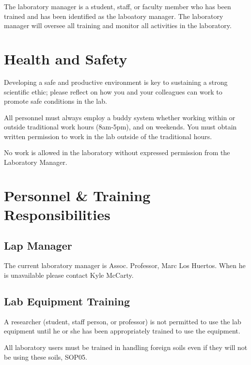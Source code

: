\documentclass[12pt]{../../cls/SOP4_alpha}\usepackage[]{graphicx}\usepackage[]{xcolor}
\begin{document}
\NP The laboratory manager is a student, staff, or faculty member who has been trained and has been identified as the laboatory manager. The laboratory manager will oversee all training and monitor all activities in the laboratory. 


\section{Health and Safety}

\NP Developing a safe and productive environment is key to sustaining a strong scientific ethic; please reflect on how you and your colleagues can work to promote safe conditions in the lab.

\NP All personnel must always employ a buddy system whether working within or outside traditional work hours (8am-5pm), and on weekends. You must obtain written permission to work in the lab outside of the traditional hours.

\NP No work is allowed in the laboratory without expressed permission from the Laboratory Manager.

\section{Personnel \& Training Responsibilities}

\subsection*{Lap Manager}

The current laboratory manager is Assoc. Professor, Marc Los Huertos. When he is unavailable please contact Kyle McCarty. 

\subsection*{Lab Equipment Training}

\NP A researcher (student, staff person, or professor) is not permitted to use the lab equipment until he or she has been appropriately trained to use the equipment.

\NP All laboratory users must be trained in handling foreign soils even if they will not be using these soils, SOP05.
\end{document}
